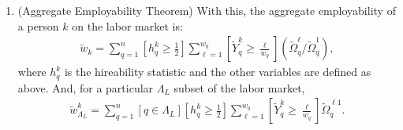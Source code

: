 \documentclass[hidelinks, nonatbib]{elsarticle}
\begin{document}
\begin{enumerate}
    \item (Aggregate Employability Theorem) With this, the aggregate employability of a person $k$ on the labor market is:
    \begin{gather}
        \tilde{w}_{k} =
        \sum_{q=1}^{n}{
            \left[
                h_{q}^{k}
                \geq 
                \frac{1}{2}
            \right]
            \sum_{\ell = 1}^{w_q}{
                \left[
                    \tilde{Y}_{q}^{k} 
                    \geq 
                    \frac{\ell}{w_q}
                \right]
                \left(
                    \tilde{\Omega}_{q}^{\ell}
                /
                    \tilde{\Omega}_{q}^{1}
                \right)
            }
        }
        ,
    \end{gather}
    where $h_{q}^{k}$ is the hireability statistic and the other variables are defined as above. And, for a particular $\Lambda_L$ subset of the labor market,
    \begin{gather}
        \tilde{w}_{\Lambda_L}^{k} =
        \sum_{q=1}^{n}{
            \left[
                q
                \in
                \Lambda_L
            \right]
            \left[
                h_{q}^{k}
                \geq 
                \frac{1}{2}
            \right]
            \sum_{\ell = 1}^{w_q}{
                \left[
                    \tilde{Y}_{q}^{k} 
                    \geq 
                    \frac{\ell}{w_q}
                \right]
                \tilde{\Omega}_{q}^{\ell 1}
            }
        }
        .
    \end{gather}


\end{enumerate}
\end{document}
